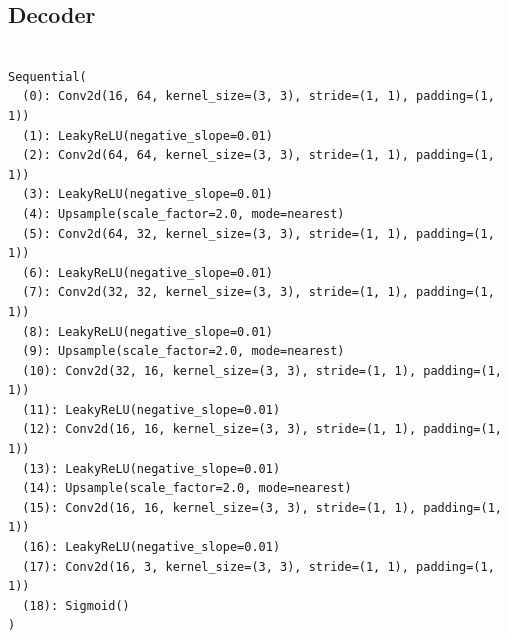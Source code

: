 \documentclass[11pt]{article} %
\begin{document}
\clearpage
\subsection{Decoder}

\begin{verbatim}

Sequential(
  (0): Conv2d(16, 64, kernel_size=(3, 3), stride=(1, 1), padding=(1, 1))
  (1): LeakyReLU(negative_slope=0.01)
  (2): Conv2d(64, 64, kernel_size=(3, 3), stride=(1, 1), padding=(1, 1))
  (3): LeakyReLU(negative_slope=0.01)
  (4): Upsample(scale_factor=2.0, mode=nearest)
  (5): Conv2d(64, 32, kernel_size=(3, 3), stride=(1, 1), padding=(1, 1))
  (6): LeakyReLU(negative_slope=0.01)
  (7): Conv2d(32, 32, kernel_size=(3, 3), stride=(1, 1), padding=(1, 1))
  (8): LeakyReLU(negative_slope=0.01)
  (9): Upsample(scale_factor=2.0, mode=nearest)
  (10): Conv2d(32, 16, kernel_size=(3, 3), stride=(1, 1), padding=(1, 1))
  (11): LeakyReLU(negative_slope=0.01)
  (12): Conv2d(16, 16, kernel_size=(3, 3), stride=(1, 1), padding=(1, 1))
  (13): LeakyReLU(negative_slope=0.01)
  (14): Upsample(scale_factor=2.0, mode=nearest)
  (15): Conv2d(16, 16, kernel_size=(3, 3), stride=(1, 1), padding=(1, 1))
  (16): LeakyReLU(negative_slope=0.01)
  (17): Conv2d(16, 3, kernel_size=(3, 3), stride=(1, 1), padding=(1, 1))
  (18): Sigmoid()
)

\end{verbatim}
\end{document}
